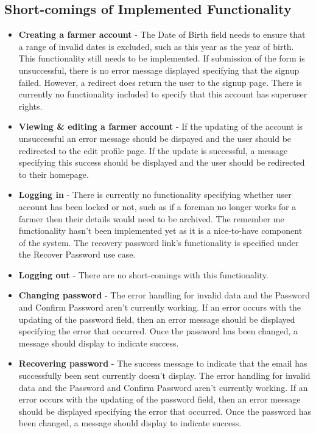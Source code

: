 \documentclass[11pt,fleqn]{book} %
\begin{document}
		\subsection{Short-comings of Implemented Functionality}
			\begin{itemize}
				\item\textbf{Creating a farmer account} -
				The Date of Birth field needs to ensure that a range of invalid dates is excluded, such as this year as the year of birth. This functionality still needs to be implemented. If submission of the form is unsuccessful, there is no error message displayed specifying that the signup failed. However, a redirect does return the user to the signup page. There is currently no functionality included to specify that this account has superuser rights.
				
				\item\textbf{Viewing \& editing a farmer account} - 
				If the updating of the account is unsuccessful an error message should be dispayed and the user should be redirected to the edit profile page. If the update is successful, a message specifying this success should be displayed and the user should be redirected to their homepage.
				
				\item\textbf{Logging in} -
				There is currently no functionality specifying whether user account has been locked or not, such as if a foreman no longer works for a farmer then their details would need to be archived. The remember me functionality hasn't been implemented yet as it is a nice-to-have component of the system. The recovery password link's functionality is specified under the Recover Password use case.
				
				\item\textbf{Logging out} -
				There are no short-comings with this functionality.
				
				\item\textbf{Changing password} -
				The error handling for invalid data and the Password and Confirm Password aren't currently working. If an error occurs with the updating of the password field, then an error message should be displayed specifying the error that occurred. Once the password has been changed, a message should display to indicate success.
				
				\item\textbf{Recovering password} -
				The success message to indicate that the email has successfully been sent currently doesn't display. The error handling for invalid data and the Password and Confirm Password aren't currently working. If an error occurs with the updating of the password field, then an error message should be displayed specifying the error that occurred. Once the password has been changed, a message should display to indicate success.
			\end{itemize}
\end{document}
